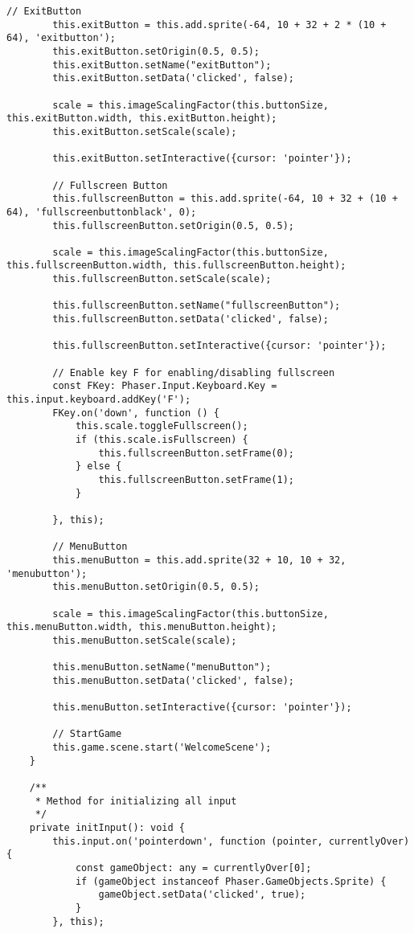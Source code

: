 \begin{lstlisting}[style=TypeScript, caption={dropDownMenu.ts}]
        // ExitButton
        this.exitButton = this.add.sprite(-64, 10 + 32 + 2 * (10 + 64), 'exitbutton');
        this.exitButton.setOrigin(0.5, 0.5);
        this.exitButton.setName("exitButton");
        this.exitButton.setData('clicked', false);

        scale = this.imageScalingFactor(this.buttonSize, this.exitButton.width, this.exitButton.height);
        this.exitButton.setScale(scale);

        this.exitButton.setInteractive({cursor: 'pointer'});

        // Fullscreen Button
        this.fullscreenButton = this.add.sprite(-64, 10 + 32 + (10 + 64), 'fullscreenbuttonblack', 0);
        this.fullscreenButton.setOrigin(0.5, 0.5);

        scale = this.imageScalingFactor(this.buttonSize, this.fullscreenButton.width, this.fullscreenButton.height);
        this.fullscreenButton.setScale(scale);

        this.fullscreenButton.setName("fullscreenButton");
        this.fullscreenButton.setData('clicked', false);

        this.fullscreenButton.setInteractive({cursor: 'pointer'});

        // Enable key F for enabling/disabling fullscreen
        const FKey: Phaser.Input.Keyboard.Key = this.input.keyboard.addKey('F');
        FKey.on('down', function () {
            this.scale.toggleFullscreen();
            if (this.scale.isFullscreen) {
                this.fullscreenButton.setFrame(0);
            } else {
                this.fullscreenButton.setFrame(1);
            }

        }, this);

        // MenuButton
        this.menuButton = this.add.sprite(32 + 10, 10 + 32, 'menubutton');
        this.menuButton.setOrigin(0.5, 0.5);

        scale = this.imageScalingFactor(this.buttonSize, this.menuButton.width, this.menuButton.height);
        this.menuButton.setScale(scale);

        this.menuButton.setName("menuButton");
        this.menuButton.setData('clicked', false);

        this.menuButton.setInteractive({cursor: 'pointer'});

        // StartGame
        this.game.scene.start('WelcomeScene');
    }

    /**
     * Method for initializing all input
     */
    private initInput(): void {
        this.input.on('pointerdown', function (pointer, currentlyOver) {
            const gameObject: any = currentlyOver[0];
            if (gameObject instanceof Phaser.GameObjects.Sprite) {
                gameObject.setData('clicked', true);
            }
        }, this);


\end{lstlisting}
